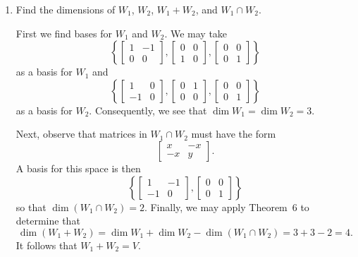 \begin{enumerate}
\item Find the dimensions of $W_1$, $W_2$, $W_1 + W_2$, and
  $W_1\cap W_2$.
  \begin{solution}
    First we find bases for $W_1$ and $W_2$. We may take
    \begin{equation*}
      \left\{
        \begin{bmatrix}
          1 & -1 \\ 0 & 0
        \end{bmatrix},
        \begin{bmatrix}
          0 & 0 \\ 1 & 0
        \end{bmatrix},
        \begin{bmatrix}
          0 & 0 \\ 0 & 1
        \end{bmatrix}
      \right\}
    \end{equation*}
    as a basis for $W_1$ and
    \begin{equation*}
      \left\{
        \begin{bmatrix}
          1 & 0 \\ -1 & 0
        \end{bmatrix},
        \begin{bmatrix}
          0 & 1 \\ 0 & 0
        \end{bmatrix},
        \begin{bmatrix}
          0 & 0 \\ 0 & 1
        \end{bmatrix}
      \right\}
    \end{equation*}
    as a basis for $W_2$. Consequently, we see that
    $\dim W_1 = \dim W_2 = 3$.

    Next, observe that matrices in $W_1\cap W_2$ must have the form
    \begin{equation*}
      \begin{bmatrix}
        x & -x \\ -x & y
      \end{bmatrix}.
    \end{equation*}
    A basis for this space is then
    \begin{equation*}
      \left\{
        \begin{bmatrix}
          1 & -1 \\ -1 & 0
        \end{bmatrix},
        \begin{bmatrix}
          0 & 0 \\ 0 & 1
        \end{bmatrix}
      \right\}
    \end{equation*}
    so that $\dim(W_1 \cap W_2) = 2$. Finally, we may apply Theorem~6
    to determine that
    \begin{equation*}
      \dim(W_1 + W_2) = \dim W_1 + \dim W_2 - \dim(W_1\cap W_2)
      = 3 + 3 - 2 = 4.
    \end{equation*}
    It follows that $W_1 + W_2 = V$.
  \end{solution}
\end{enumerate}

